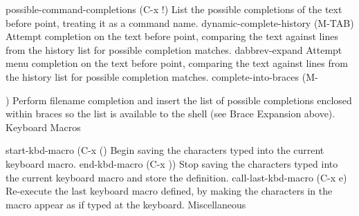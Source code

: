 \documentclass[11pt]{article}
\begin{document}
{{{possible-command-completions (C-x !)
List the possible completions of the text before point, treating it as a command name.
dynamic-complete-history (M-TAB)
Attempt completion on the text before point, comparing the text against lines from the history list for possible completion matches.
dabbrev-expand
Attempt menu completion on the text before point, comparing the text against lines from the history list for possible completion matches.
complete-into-braces (M-{)
Perform filename completion and insert the list of possible completions enclosed within braces so the list is available to the shell (see Brace Expansion above).
Keyboard Macros

start-kbd-macro (C-x ()
Begin saving the characters typed into the current keyboard macro.
end-kbd-macro (C-x ))
Stop saving the characters typed into the current keyboard macro and store the definition.
call-last-kbd-macro (C-x e)
Re-execute the last keyboard macro defined, by making the characters in the macro appear as if typed at the keyboard.
Miscellaneous

}}}}
\end{document}
